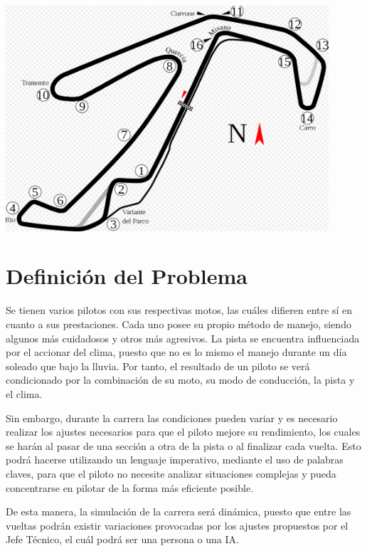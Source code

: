 \documentclass[12pt, letterpaper,spanish]{article}
\theoremstyle{definition}
\theoremstyle{remark}
\begin{document}
	\begin{center}
		\includegraphics[width = 12cm]{circuito} 
	\end{center}

\section{Definición del Problema}
	Se tienen varios pilotos con sus respectivas motos, las cuáles difieren entre sí en cuanto a sus prestaciones. Cada uno posee su propio método de manejo, siendo algunos más cuidadosos y otros más agresivos. La pista se encuentra influenciada por el accionar del clima, puesto que no es lo mismo el manejo durante un día soleado que bajo la lluvia. Por tanto, el resultado de un piloto se verá condicionado por la combinación de su moto, su modo de conducción, la pista y el clima.\par
	Sin embargo, durante la carrera las condiciones pueden variar y es necesario realizar los ajustes necesarios para que el piloto mejore su rendimiento, los cuales se harán al pasar de una sección a otra de la pista o al finalizar cada vuelta. Esto podrá hacerse utilizando un lenguaje imperativo, mediante el uso de palabras claves, para que el piloto no necesite analizar situaciones complejas y pueda concentrarse en pilotar de la forma más eficiente posible.\par
	De esta manera, la simulación de la carrera será dinámica, puesto que entre las vueltas podrán existir variaciones provocadas por los ajustes propuestos por el Jefe Técnico, el cuál podrá ser una persona o una IA.\par


\newpage
			
\end{document}
